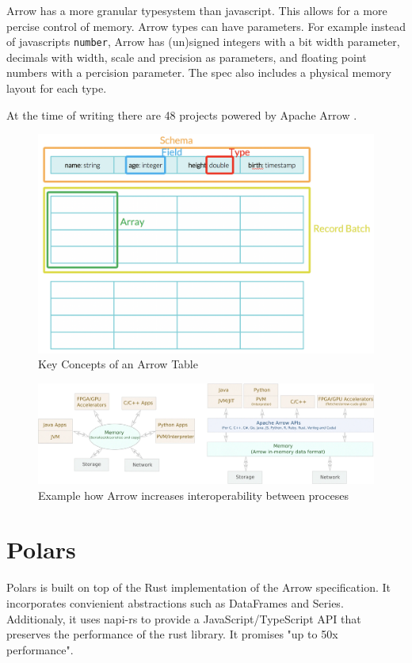 Arrow has a more granular typesystem than javascript. This allows for a more percise control of memory.
Arrow types can have parameters.
For example instead of javascripts \Verb|number|, Arrow has (un)signed integers with a bit width parameter,
decimals with width, scale and precision as parameters, and floating point numbers with a percision parameter.
The spec also includes a physical memory layout for each type.

At the time of writing there are 48 projects powered by Apache Arrow \autocite{arrow:projects}.

\begin{figure}
	\includegraphics[width=\textwidth]{resources/arrow_tab}
	\caption{Key Concepts of an Arrow Table \autocite{Dremio}}
	\label{fig:arrow_tab}
\end{figure}
\begin{figure}
	\includegraphics[width=\textwidth]{resources/arrow_interop}
	\caption{Example how Arrow increases interoperability between proceses \autocite{Ahmad2020}}
	\label{fig:arrow_com}
\end{figure}


\section{Polars}
\label{section:polars}
Polars is built on top of the Rust implementation of the Arrow specification.
It incorporates convienient abstractions such as DataFrames and Series.
Additionaly, it uses napi-rs to provide a JavaScript/TypeScript \ac{API} that preserves the performance of the rust library.
It promises "up to 50x performance".
\autocite{polars}

